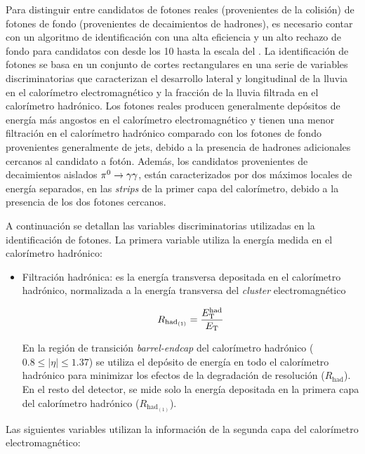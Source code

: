 Para distinguir entre candidatos de fotones reales (provenientes de la colisión) de fotones de fondo
(provenientes de decaimientos de hadrones), es
necesario contar con un algoritmo de identificación con una alta eficiencia y un alto rechazo
de fondo para candidatos con {\et} desde los 10 {\gev} hasta la escala del
{\tev}. La identificación de fotones se basa en un conjunto de cortes
rectangulares en una serie de variables discriminatorias
que caracterizan el desarrollo lateral y longitudinal de la
lluvia en el calorímetro electromagnético y la fracción de la lluvia filtrada en
el calorímetro hadrónico. Los fotones reales producen generalmente depósitos de
energía más angostos en el calorímetro electromagnético y tienen una menor
filtración en el calorímetro hadrónico comparado con los fotones de fondo
provenientes generalmente de jets, debido a la presencia de hadrones adicionales cercanos al
candidato a fotón. Además, los candidatos provenientes de
decaimientos aislados $\pi^0 \to \gam\gam$, están caracterizados por dos máximos
locales de energía separados, en las \emph{strips} de la primer capa del calorímetro,
debido a la presencia de los dos fotones cercanos.

A continuación se detallan las variables discriminatorias utilizadas en la
identificación de fotones. La primera variable utiliza la energía medida en el
calorímetro hadrónico:

\begin{itemize}\itemsep0.2cm\parskip0.2cm

\item Filtración hadrónica: es la energía transversa depositada en el
  calorímetro hadrónico, normalizada a la energía transversa del \emph{cluster}
  electromagnético

  \begin{equation}
    R_{\mathrm{had}_{(1)}} = \frac{E_{\mathrm{T}}^{\mathrm{had}}}{E_{\mathrm{T}}}
  \end{equation}

  En la región de transición \emph{barrel-endcap} del calorímetro hadrónico ($0.8\leq |\eta| \leq 1.37$) se utiliza
  el depósito de energía en todo el calorímetro hadrónico para minimizar los efectos de la
  degradación de resolución ($R_{\mathrm{had}}$). En el resto del detector, se mide solo la
  energía depositada en la primera capa del calorímetro hadrónico ($R_{\mathrm{had}_{(1)}}$).
\end{itemize}

Las siguientes variables utilizan la información de la segunda capa del calorímetro
electromagnético:

